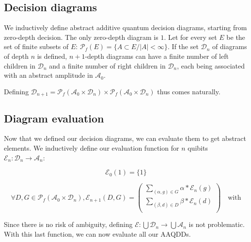 \documentclass{article}
\begin{document}
\subsection{Decision diagrams}

We inductively define abstract additive quantum decision diagrams, starting from zero-depth decision. The only zero-depth diagram is $\boxed{1}$. Let for every set $E$ be the set of finite subsets of $E$: $\mathscr{P}_f(E) = \{ A \subset E / |A| < \infty \}$. If the set $\mathcal{D}_n$ of diagrams of depth $n$ is defined, $n+1$-depth diagrams can have a finite number of left children in $\mathcal{D}_n$ and a finite number of right children in $\mathcal{D}_n$, each being associated with an abstract amplitude in $\mathcal{A}_0$.

\begin{center}
\end{center}

Defining $\mathcal{D}_{n+1} = \mathscr{P}_f(\mathcal{A}_0 \times \mathcal{D}_n) \times \mathscr{P}_f(\mathcal{A}_0 \times \mathcal{D}_n)$ thus comes naturally.

\subsection{Diagram evaluation}

Now that we defined our decision diagrams, we can evaluate them to get abstract elements. We inductively define our evaluation function for $n$ quibits $\mathcal{E}_n : \mathcal{D}_n \rightarrow \mathcal{A}_n$:

$$\mathcal{E}_0(\boxed{1}) = \{1\}$$

$$\forall D, G \in \mathscr{P}_f(\mathcal{A}_0 \times \mathcal{D}_n), \mathcal{E}_{n+1}(D, G) =
\begin{pmatrix}
    \displaystyle\sum_{(\alpha, g) \in G} \alpha * \mathcal{E}_n(g) \\
    \displaystyle\sum_{(\beta, d) \in D} \beta * \mathcal{E}_n(d) \\
\end{pmatrix}
\quad\text{with}
$$

Since there is no risk of ambiguity, defining $\mathcal{E} : \bigcup \mathcal{D}_n \rightarrow \bigcup \mathcal{A}_n$ is not problematic. With this last function, we can now evaluate all our AAQDDs.
\end{document}
